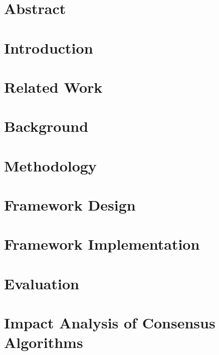 \documentclass[12pt,a4paper,oneside]{book}
\begin{document}



\chapter*{Abstract}\label{chapter:abstract}


\tableofcontents

\listoffigures

\listoftables

\chapter{Introduction}\label{chapter:introduction}


\chapter{Related Work}\label{chapter:related_work}


\chapter{Background}\label{chapter:background}


\chapter{Methodology}\label{chapter:methodology}


\chapter{Framework Design}\label{chapter:design}


\chapter{Framework Implementation}\label{chapter:implementation}


\chapter{Evaluation}\label{chapter:evaluation}


\chapter{Impact Analysis of Consensus Algorithms}\label{chapter:analysis:consensus_algorithms}

\end{document}

